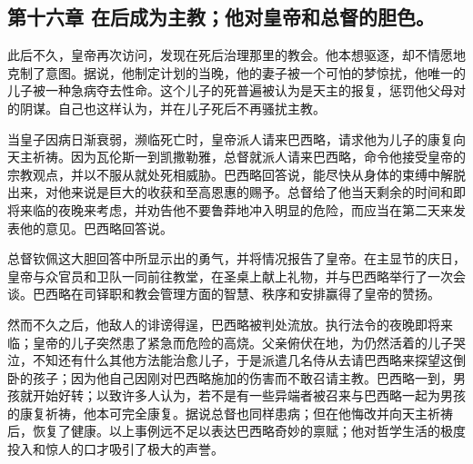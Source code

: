 
\subsection{第十六章 在后成为主教；他对皇帝和总督的胆色。}

此后不久，皇帝再次访问，发现在死后治理那里的教会。他本想驱逐，却不情愿地克制了意图。据说，他制定计划的当晚，他的妻子被一个可怕的梦惊扰，他唯一的儿子被一种急病夺去性命。这个儿子的死普遍被认为是天主的报复，惩罚他父母对的阴谋。自己也这样认为，并在儿子死后不再骚扰主教。\par

当皇子因病日渐衰弱，濒临死亡时，皇帝派人请来巴西略，请求他为儿子的康复向天主祈祷。因为瓦伦斯一到凯撒勒雅，总督就派人请来巴西略，命令他接受皇帝的宗教观点，并以不服从就处死相威胁。巴西略回答说，能尽快从身体的束缚中解脱出来，对他来说是巨大的收获和至高恩惠的赐予。总督给了他当天剩余的时间和即将来临的夜晚来考虑，并劝告他不要鲁莽地冲入明显的危险，而应当在第二天来发表他的意见。巴西略回答说。\par

总督钦佩这大胆回答中所显示出的勇气，并将情况报告了皇帝。在主显节的庆日，皇帝与众官员和卫队一同前往教堂，在圣桌上献上礼物，并与巴西略举行了一次会谈。巴西略在司铎职和教会管理方面的智慧、秩序和安排赢得了皇帝的赞扬。\par

然而不久之后，他敌人的诽谤得逞，巴西略被判处流放。执行法令的夜晚即将来临；皇帝的儿子突然患了紧急而危险的高烧。父亲俯伏在地，为仍然活着的儿子哭泣，不知还有什么其他方法能治愈儿子，于是派遣几名侍从去请巴西略来探望这倒卧的孩子；因为他自己因刚对巴西略施加的伤害而不敢召请主教。巴西略一到，男孩就开始好转；以致许多人认为，若不是有一些异端者被召来与巴西略一起为男孩的康复祈祷，他本可完全康复。据说总督也同样患病；但在他悔改并向天主祈祷后，恢复了健康。以上事例远不足以表达巴西略奇妙的禀赋；他对哲学生活的极度投入和惊人的口才吸引了极大的声誉。\par

